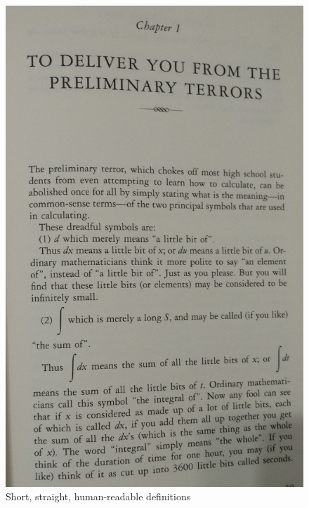 \documentclass{cornell}
\begin{document}
\begin{figure}[!t]
\centering
\includegraphics[width=1.0\linewidth]{images/cme03.jpg}
\caption{Short, straight, human-readable definitions }
\label{cme03}
\end{figure}


\end{document}
